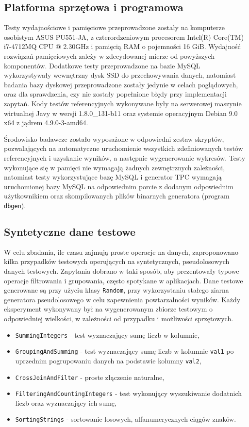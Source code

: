 \documentclass[12pt,twoside,openright]{extarticle}
\begin{document}
\subsection{Platforma sprzętowa i programowa}

    Testy wydajnościowe i pamięciowe przeprowadzone zostały na komputerze osobistym ASUS PU551-JA, z czterordzeniowym procesorem Intel(R) Core(TM) i7-4712MQ CPU @ 2.30GHz i pamięcią RAM o pojemności 16 GiB. Wydajność rozwiązań pamięciowych zależy w zdecydowanej mierze od powyższych komponentów. Dodatkowe testy przeprowadzone na bazie MySQL wykorzystywały wewnętrzny dysk SSD  do przechowywania danych, natomiast badania bazy dyskowej przeprowadzone zostały jedynie w celach poglądowych, oraz dla sprawdzenia, czy nie zostały popełnione błędy przy implementacji zapytań. Kody testów referencyjnych wykonywane były na serwerowej maszynie wirtualnej Javy w wersji 1.8.0\_131-b11 oraz systemie operacyjnym Debian 9.0 x64 z jądrem 4.9.0-3-amd64.

    Środowisko badawcze zostało wyposażone w odpowiedni zestaw skryptów, pozwalających na automatyczne uruchomienie wszystkich zdefiniowanych testów referencyjnych i uzyskanie wyników, a następnie wygenerowanie wykresów. Testy wykonujące się w pamięci nie wymagają żadnych zewnętrznych zależności, natomiast testy wykorzystujące bazę MySQL i generator TPC wymagają uruchomionej bazy MySQL na odpowiednim porcie z dodanym odpowiednim użytkownikiem oraz skompilowanych plików binarnych generatora (program \texttt{dbgen}).


\subsection{Syntetyczne dane testowe}

    W celu zbadania, ile czasu zajmują proste operacje na danych, zaproponowano kilka przypadków testowych operujących na syntetycznych, pseudolosowych danych testowych. Zapytania dobrano w taki sposób, aby prezentowały typowe operacje filtrowania i grupowania, często spotykane w aplikacjach. Dane testowe generowane są przy użyciu klasy \texttt{Random}, przy wykorzystaniu stałego ziarna generatora pseudolosowego w celu zapewnienia powtarzalności wyników. Każdy eksperyment wykonywany był na wygenerowanym zbiorze testowym o odpowiedniej wielkości, w zależności od przypadku i możliwości sprzętowych.

\begin{itemize}
    \item \texttt{SummingIntegers} - test wyznaczający sumę liczb w kolumnie,
    \item \texttt{GroupingAndSumming} - test wyznaczający sumę liczb w kolumnie \texttt{val1} po uprzednim pogrupowaniu danych na podstawie kolumny \texttt{val2},
    \item \texttt{CrossJoinAndFilter} - proste złączenie naturalne,
    \item \texttt{FilteringAndCountingIntegers} - test wykonujący wyszukiwanie dodatnich liczb oraz wyznaczający ich sumę,
    \item \texttt{SortingStrings} - sortowanie losowych, alfanumerycznych ciągów znaków.
\end{itemize}
\end{document}
